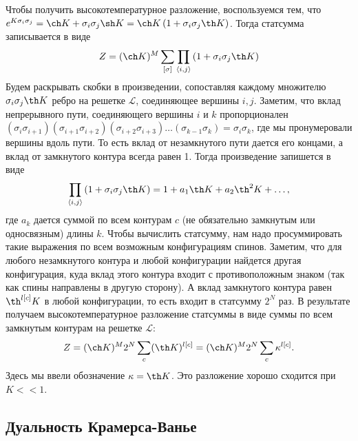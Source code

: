\documentclass[a4paper,12pt]{article}
\theoremstyle{definition}
\theoremstyle{definition}
\theoremstyle{definition}
\begin{document}
Чтобы получить высокотемпературное разложение, воспользуемся тем, что $e^{K\sigma_i\sigma_j}=\ch K+\sigma_i\sigma_j\sh K=\ch K \left(1+\sigma_i\sigma_j \th K\right)$. Тогда статсумма записывается в виде
\begin{equation}
  \label{eq:80}
  Z=(\ch K)^M\sum_{[\sigma]}\prod_{\left<i,j\right>}\left(1+\sigma_i \sigma_j \th K\right)
\end{equation}
Будем раскрывать скобки в произведении, сопоставляя каждому множителю $\sigma_i\sigma_j \th K$ ребро на решетке $\mathcal{L}$, соединяющее вершины $i,j$. Заметим, что вклад непрерывного пути, соединяющего вершины $i$ и $k$ пропорционален $(\sigma_i \sigma_{i+1}) (\sigma_{i+1}\sigma_{i+2}) (\sigma_{i+2}\sigma_{i+3})\dots (\sigma_{k-1}\sigma_k)=\sigma_{i}\sigma_k$, где мы пронумеровали вершины вдоль пути. То есть вклад от незамкнутого пути дается его концами, а вклад от замкнутого контура всегда равен 1.  Тогда произведение запишется в виде
\begin{equation}
  \label{eq:107}
  \prod_{\left<i,j\right>}\left(1+\sigma_i \sigma_j \th K\right)=1+a_1 \th K +a_2 \th^2 K+\dots,
\end{equation}
где $a_k$ дается суммой по всем контурам $c$ (не обязательно замкнутым или односвязным) длины $k$.
Чтобы вычислить статсумму, нам надо просуммировать такие выражения по всем возможным конфигурациям спинов. Заметим, что для любого незамкнутого контура и любой конфигурации найдется другая конфигурация, куда вклад этого контура входит с противоположным знаком (так как спины направлены в другую сторону). А вклад замкнутого контура равен $\th^{l[c]}K$ в любой конфигурации, то есть входит в статсумму $2^N$ раз. В результате получаем высокотемпературное разложение статсуммы в виде суммы по всем замкнутым контурам на решетке $\mathcal{L}$:
\begin{equation}
  \label{eq:108}
  Z=(\ch K)^M 2^N \sum_c (\th K)^{l[c]}=(\ch K)^M 2^N \sum_c \kappa^{l[c]}.
\end{equation}
Здесь мы ввели обозначение $\kappa=\th K$. Это разложение хорошо сходится при $K<<1$.

\subsection{Дуальность Крамерса-Ванье}
\label{sec:duality}
\end{document}
